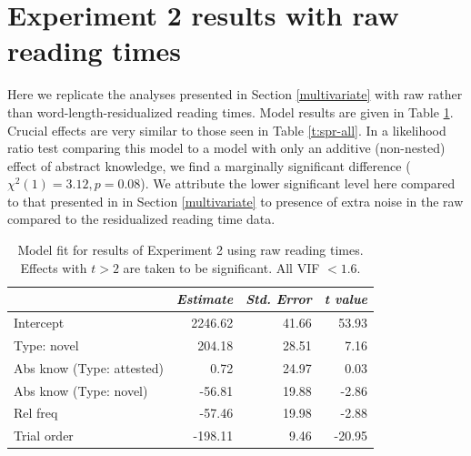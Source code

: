 \documentclass[authoryear]{elsarticle}
\begin{document}
\section{Experiment 2 results with raw reading times}\label{raw-rts}
Here we replicate the analyses presented in Section \ref{multivariate} with raw rather than word-length-residualized reading times. Model results are given in Table \ref{t:spr-all-raw}. Crucial effects are very similar to those seen in Table \ref{t:spr-all}. In a likelihood ratio test comparing this model to a model with only an additive (non-nested) effect of abstract knowledge, we find a marginally significant difference ($\chi^{2}(1)=3.12, p=0.08$). We attribute the lower significant level here compared to that presented in in Section \ref{multivariate} to presence of extra noise in the raw compared to the residualized reading time data.

\begin{table}[t]
\centering
\begin{tabular}{ l  r  r  r  }
\hline\hline
 & \emph{Estimate} &\emph{Std. Error} & \emph{t value}  \\\hline    
Intercept   &  2246.62   &  41.66   & 53.93\\ 
Type: novel & 204.18 &    28.51  & 7.16\\ 
Abs know (Type: attested)      &   0.72    & 24.97  &  0.03\\ 
Abs know (Type: novel) & -56.81 &     19.88 &  -2.86 \\ 
Rel freq &  -57.46  &   19.98  & -2.88\\ 
Trial order &           -198.11   &   9.46 & -20.95\\\hline 
\end{tabular}
\caption{Model fit for results of Experiment 2 using raw reading times. Effects with $t>2$ are taken to be significant. All VIF $< 1.6$.}\label{t:spr-all-raw}
\end{table}


\end{document}
